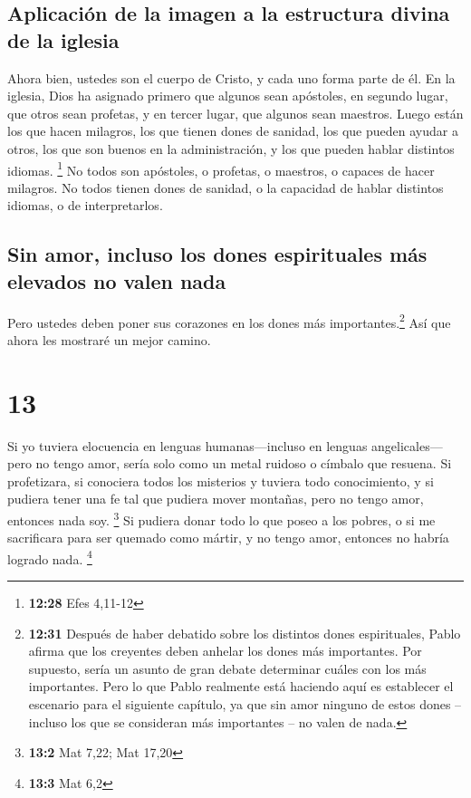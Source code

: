 \hypertarget{aplicaciuxf3n-de-la-imagen-a-la-estructura-divina-de-la-iglesia}{%
\subsection{Aplicación de la imagen a la estructura divina de la
iglesia}\label{aplicaciuxf3n-de-la-imagen-a-la-estructura-divina-de-la-iglesia}}

 Ahora bien, ustedes son el cuerpo de Cristo, y cada uno
forma parte de él.  En la iglesia, Dios ha asignado
primero que algunos sean apóstoles, en segundo lugar, que otros sean
profetas, y en tercer lugar, que algunos sean maestros. Luego están los
que hacen milagros, los que tienen dones de sanidad, los que pueden
ayudar a otros, los que son buenos en la administración, y los que
pueden hablar distintos idiomas. \footnote{\textbf{12:28} Efes 4,11-12}
 No todos son apóstoles, o profetas, o maestros, o
capaces de hacer milagros.  No todos tienen dones de
sanidad, o la capacidad de hablar distintos idiomas, o de
interpretarlos.

\hypertarget{sin-amor-incluso-los-dones-espirituales-muxe1s-elevados-no-valen-nada}{%
\subsection{Sin amor, incluso los dones espirituales más elevados no
valen
nada}\label{sin-amor-incluso-los-dones-espirituales-muxe1s-elevados-no-valen-nada}}

 Pero ustedes deben poner sus corazones en los dones más
importantes.\footnote{\textbf{12:31} Después de haber debatido sobre los
  distintos dones espirituales, Pablo afirma que los creyentes deben
  anhelar los dones más importantes. Por supuesto, sería un asunto de
  gran debate determinar cuáles con los más importantes. Pero lo que
  Pablo realmente está haciendo aquí es establecer el escenario para el
  siguiente capítulo, ya que sin amor ninguno de estos dones -- incluso
  los que se consideran más importantes -- no valen de nada.} Así que
ahora les mostraré un mejor camino.

\hypertarget{section-12}{%
\section{13}\label{section-12}}

 Si yo tuviera elocuencia en lenguas humanas---incluso en
lenguas angelicales---pero no tengo amor, sería solo como un metal
ruidoso o címbalo que resuena.  Si profetizara, si
conociera todos los misterios y tuviera todo conocimiento, y si pudiera
tener una fe tal que pudiera mover montañas, pero no tengo amor,
entonces nada soy. \footnote{\textbf{13:2} Mat 7,22; Mat 17,20}
 Si pudiera donar todo lo que poseo a los pobres, o si me
sacrificara para ser quemado como mártir, y no tengo amor, entonces no
habría logrado nada. \footnote{\textbf{13:3} Mat 6,2}

